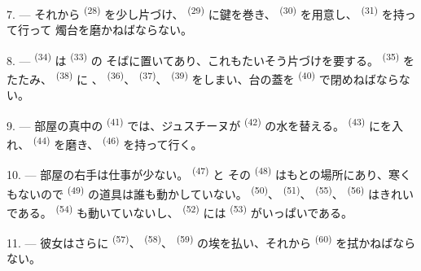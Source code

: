 7. --- それから \textsuperscript{(28)} を少し片づけ、
 \textsuperscript{(29)} に鍵を巻き、
\textsuperscript{(30)} を用意し、 \textsuperscript{(31)} を持って行って
燭台を磨かねばならない。

\VUsaut{5.0mm}
\VUsaut{3.0mm}

8. ---  \textsuperscript{(34)} は \textsuperscript{(33)} の
そばに置いてあり、これもたいそう片づけを要する。
\textsuperscript{(35)} をたたみ、 \textsuperscript{(38)} に
、 \textsuperscript{(36)}、 \textsuperscript{(37)}、
 \textsuperscript{(39)} をしまい、台の蓋を \textsuperscript{(40)}
で閉めねばならない。

9. --- 部屋の真中の \textsuperscript{(41)} では、ジュスチーヌが
 \textsuperscript{(42)} の水を替える。
\textsuperscript{(43)} にを入れ、 \textsuperscript{(44)}
を磨き、 \textsuperscript{(46)} を持って行く。

10. --- 部屋の右手は仕事が少ない。 \textsuperscript{(47)} と
その \textsuperscript{(48)} はもとの場所にあり、寒くもないので
 \textsuperscript{(49)} の道具は誰も動かしていない。
\textsuperscript{(50)}、 \textsuperscript{(51)}、
\textsuperscript{(55)}、 \textsuperscript{(56)} はきれいである。
 \textsuperscript{(54)} も動いていないし、
\textsuperscript{(52)} には \textsuperscript{(53)} がいっぱいである。



11. --- 彼女はさらに \textsuperscript{(57)}、
\textsuperscript{(58)}、 \textsuperscript{(59)} の埃を払い、それから
 \textsuperscript{(60)} を拭かねばならない。

